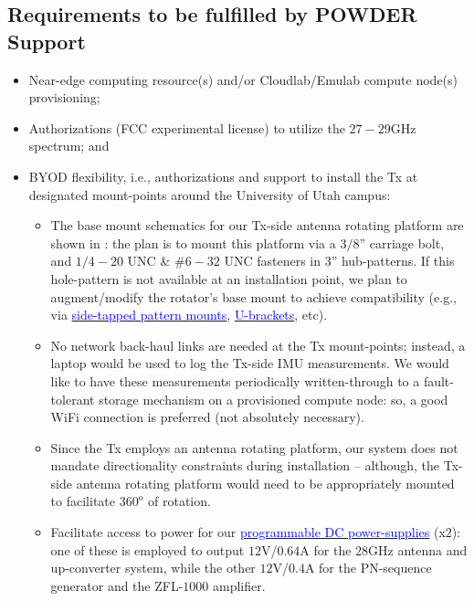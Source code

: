\documentclass[12pt]{article}
\begin{document}
    \subsection{Requirements to be fulfilled by POWDER Support}
        \begin{itemize}
            \item Near-edge computing resource(s) and/or Cloudlab/Emulab compute node(s) provisioning;
            \item Authorizations (FCC experimental license) to utilize the $27-29$GHz spectrum; and
            \item BYOD flexibility, i.e., authorizations and support to install the Tx at designated mount-points around the University of Utah campus:
            \begin{itemize}
                \item The base mount schematics for our Tx-side antenna rotating platform are shown in : the plan is to mount this platform via a $3/8$'' carriage bolt, and $1/4{-}20$ UNC \& $\#6{-}32$ UNC fasteners in $3$'' hub-patterns. If this hole-pattern is not available at an installation point, we plan to augment/modify the rotator's base mount to achieve compatibility (e.g., via \href{https://www.servocity.com/side-tapped-pattern-mount-f/}{\textcolor{blue}{side-tapped pattern mounts}}, \href{https://www.servocity.com/brackets/}{\textcolor{blue}{U-brackets}}, etc).
                \item No network back-haul links are needed at the Tx mount-points; instead, a laptop would be used to log the Tx-side IMU measurements. We would like to have these measurements periodically written-through to a fault-tolerant storage mechanism on a provisioned compute node: so, a good WiFi connection is preferred (not absolutely necessary).
                \item Since the Tx employs an antenna rotating platform, our system does not mandate directionality constraints during installation -- although, the Tx-side antenna rotating platform would need to be appropriately mounted to facilitate $360^\text{o}$ of rotation.
                \item Facilitate access to power for our \href{https://www.keysight.com/us/en/assets/7018-06785/data-sheets/5968-9726.pdf}{\textcolor{blue}{programmable DC power-supplies}} (x$2$): one of these is employed to output $12$V/$0.64$A for the $28$GHz antenna and up-converter system, while the other $12$V/$0.4$A for the PN-sequence generator and the ZFL-$1000$ amplifier.

\end{itemize}
\end{itemize}
\end{document}
